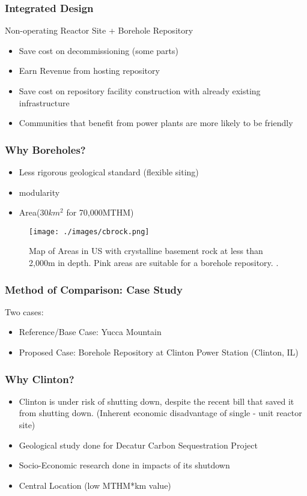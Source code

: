 	\begin{frame}
	\frametitle{Integrated Design}
	Non-operating Reactor Site + Borehole Repository
	\begin{itemize}
		\item Save cost on decommissioning (some parts)
		\item Earn Revenue from hosting repository
		\item Save cost on repository facility construction
			  with already existing infrastructure
		\item Communities that benefit from power plants are more likely
			  to be friendly
	\end{itemize}
\end{frame}

\begin{frame}
	\frametitle{Why Boreholes?}
	\begin{itemize}
		\item Less rigorous geological standard (flexible siting)
		\item modularity
		\item Area(30$km^2$ for 70,000MTHM)
	\end{itemize}
	\begin{figure}[htbp!]
		\begin{center}
			\texttt{[image: ./images/cbrock.png]}
		\end{center}
		\caption{Map of Areas in US with crystalline basement rock at less than 2,000m in depth.
			Pink areas are suitable for a borehole repository.
			 \cite{freeze_siting_2015}.}
		\label{fig:basement_map}
	\end{figure}
\end{frame}

\begin{frame}
	\frametitle{Method of Comparison: Case Study}
	Two cases:
	\begin{itemize}
		\item Reference/Base Case: Yucca Mountain 
		\item Proposed Case: Borehole Repository at Clinton Power Station (Clinton, IL)
	\end{itemize}
\end{frame}

\begin{frame}
	\frametitle{Why Clinton?}
	\begin{itemize}
		\item Clinton is under risk of shutting down, despite the recent bill that saved it from shutting down. (Inherent economic disadvantage of single - unit reactor site)
		\item Geological study done for Decatur Carbon Sequestration Project
		\item Socio-Economic research done in impacts of its shutdown
		\item Central Location (low MTHM*km value)
	\end{itemize}
\end{frame}

